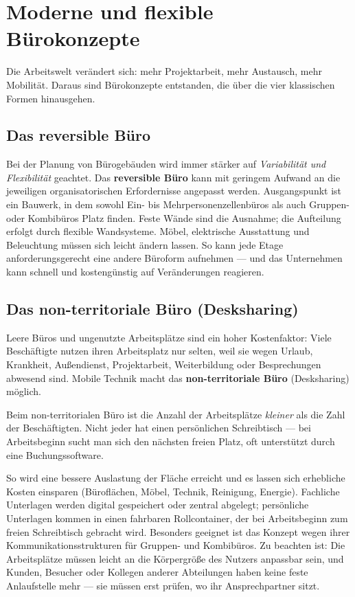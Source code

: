 \documentclass[11pt, a4paper]{article}
\begin{document}
\section{Moderne und flexible Bürokonzepte}

Die Arbeitswelt verändert sich: mehr Projektarbeit, mehr Austausch, mehr Mobilität.
Daraus sind Bürokonzepte entstanden, die über die vier klassischen Formen hinausgehen.

\subsection{Das reversible Büro}

Bei der Planung von Bürogebäuden wird immer stärker auf \emph{Variabilität und
Flexibilität} geachtet. Das \textbf{reversible Büro} kann mit geringem Aufwand an die
jeweiligen organisatorischen Erfordernisse angepasst werden. Ausgangspunkt ist ein
Bauwerk, in dem sowohl Ein- bis Mehrpersonenzellenbüros als auch Gruppen- oder
Kombibüros Platz finden. Feste Wände sind die Ausnahme; die Aufteilung erfolgt durch
flexible Wandsysteme. Möbel, elektrische Ausstattung und Beleuchtung müssen sich leicht
ändern lassen. So kann jede Etage anforderungsgerecht eine andere Büroform aufnehmen ---
und das Unternehmen kann schnell und kostengünstig auf Veränderungen reagieren.

\subsection{Das non-territoriale Büro (Desksharing)}

Leere Büros und ungenutzte Arbeitsplätze sind ein hoher Kostenfaktor: Viele Beschäftigte
nutzen ihren Arbeitsplatz nur selten, weil sie wegen Urlaub, Krankheit, Außendienst,
Projektarbeit, Weiterbildung oder Besprechungen abwesend sind. Mobile Technik macht das
\textbf{non-territoriale Büro} (Desksharing) möglich.

\begin{merksatz}
Beim non-territorialen Büro ist die Anzahl der Arbeitsplätze \emph{kleiner} als die Zahl
der Beschäftigten. Nicht jeder hat einen persönlichen Schreibtisch --- bei Arbeitsbeginn
sucht man sich den nächsten freien Platz, oft unterstützt durch eine Buchungssoftware.
\end{merksatz}

So wird eine bessere Auslastung der Fläche erreicht und es lassen sich erhebliche Kosten
einsparen (Büroflächen, Möbel, Technik, Reinigung, Energie). Fachliche Unterlagen werden
digital gespeichert oder zentral abgelegt; persönliche Unterlagen kommen in einen
fahrbaren Rollcontainer, der bei Arbeitsbeginn zum freien Schreibtisch gebracht wird.
Besonders geeignet ist das Konzept wegen ihrer Kommunikationsstrukturen für Gruppen-
und Kombibüros. Zu beachten ist: Die Arbeitsplätze müssen leicht an die Körpergröße des
Nutzers anpassbar sein, und Kunden, Besucher oder Kollegen anderer Abteilungen haben
keine feste Anlaufstelle mehr --- sie müssen erst prüfen, wo ihr Ansprechpartner sitzt.
\end{document}
